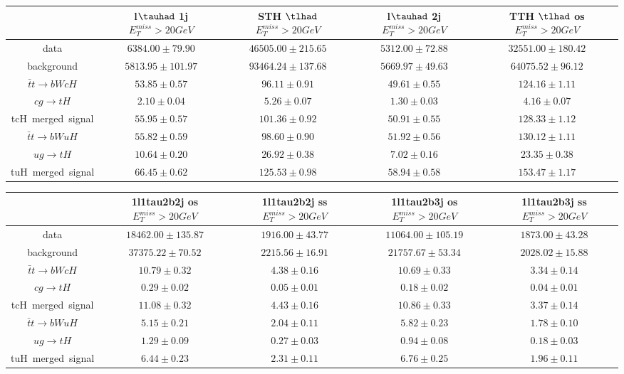 \centering
\begin{tabular}{|c|c|c|c|c|} \hline
 & l$\tauhad$ 1j  $E_T^{miss}>20GeV$ & STH $\tlhad$   $E_T^{miss}>20GeV$ & l$\tauhad$ 2j  $E_T^{miss}>20GeV$ & TTH $\tlhad$ os  $E_T^{miss}>20GeV$\\\hline
data & $6384.00\pm79.90$ & $46505.00\pm215.65$ & $5312.00\pm72.88$ & $32551.00\pm180.42$\\\hline
background & $5813.95\pm101.97$ & $93464.24\pm137.68$ & $5669.97\pm49.63$ & $64075.52\pm96.12$\\\hline
$\bar{t}t\to bWcH$ & $53.85\pm0.57$ & $96.11\pm0.91$ & $49.61\pm0.55$ & $124.16\pm1.11$\\\hline
$cg\to tH$ & $2.10\pm0.04$ & $5.26\pm0.07$ & $1.30\pm0.03$ & $4.16\pm0.07$\\\hline
tcH~merged~signal & $55.95\pm0.57$ & $101.36\pm0.92$ & $50.91\pm0.55$ & $128.33\pm1.12$\\\hline
$\bar{t}t\to bWuH$ & $55.82\pm0.59$ & $98.60\pm0.90$ & $51.92\pm0.56$ & $130.12\pm1.11$\\\hline
$ug\to tH$ & $10.64\pm0.20$ & $26.92\pm0.38$ & $7.02\pm0.16$ & $23.35\pm0.38$\\\hline
tuH~merged~signal & $66.45\pm0.62$ & $125.53\pm0.98$ & $58.94\pm0.58$ & $153.47\pm1.17$\\\hline
\end{tabular}
\begin{tabular}{|c|c|c|c|c|} \hline
 & 1l1tau2b2j os  $E_T^{miss}>20GeV$ & 1l1tau2b2j ss  $E_T^{miss}>20GeV$ & 1l1tau2b3j os  $E_T^{miss}>20GeV$ & 1l1tau2b3j ss  $E_T^{miss}>20GeV$\\\hline
data & $18462.00\pm135.87$ & $1916.00\pm43.77$ & $11064.00\pm105.19$ & $1873.00\pm43.28$\\\hline
background & $37375.22\pm70.52$ & $2215.56\pm16.91$ & $21757.67\pm53.34$ & $2028.02\pm15.88$\\\hline
$\bar{t}t\to bWcH$ & $10.79\pm0.32$ & $4.38\pm0.16$ & $10.69\pm0.33$ & $3.34\pm0.14$\\\hline
$cg\to tH$ & $0.29\pm0.02$ & $0.05\pm0.01$ & $0.18\pm0.02$ & $0.04\pm0.01$\\\hline
tcH~merged~signal & $11.08\pm0.32$ & $4.43\pm0.16$ & $10.86\pm0.33$ & $3.37\pm0.14$\\\hline
$\bar{t}t\to bWuH$ & $5.15\pm0.21$ & $2.04\pm0.11$ & $5.82\pm0.23$ & $1.78\pm0.10$\\\hline
$ug\to tH$ & $1.29\pm0.09$ & $0.27\pm0.03$ & $0.94\pm0.08$ & $0.18\pm0.03$\\\hline
tuH~merged~signal & $6.44\pm0.23$ & $2.31\pm0.11$ & $6.76\pm0.25$ & $1.96\pm0.11$\\\hline
\end{tabular}
